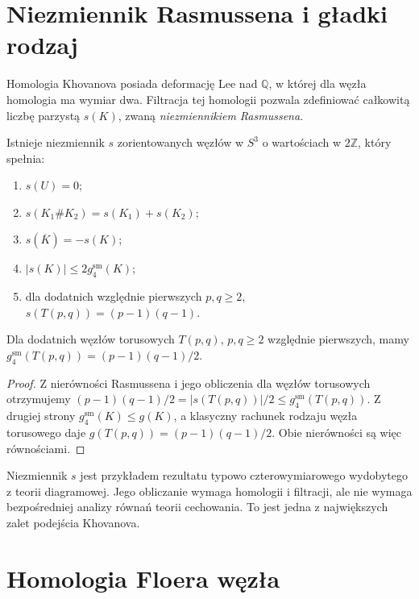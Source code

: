 \section{Niezmiennik Rasmussena i gładki rodzaj}
\label{sec:kt-rasmussen}

Homologia Khovanova posiada deformację Lee nad $\mathbb Q$,
w której dla węzła homologia ma wymiar dwa. Filtracja
tej homologii pozwala zdefiniować całkowitą liczbę parzystą
$s(K)$, zwaną \emph{niezmiennikiem Rasmussena}.

\begin{twierdzenie}[Rasmussen]
Istnieje niezmiennik $s$ zorientowanych węzłów w $S^3$
o wartościach w $2\mathbb Z$, który spełnia:
\begin{enumerate}[label=(\roman*)]
\item $s(U)=0$;
\item $s(K_1\#K_2)=s(K_1)+s(K_2)$;
\item $s(\overline K)=-s(K)$;
\item $|s(K)|\leq2g_4^{\mathrm{sm}}(K)$;
\item dla dodatnich względnie pierwszych $p,q\geq2$,
$s(T(p,q))=(p-1)(q-1)$.
\end{enumerate}
\end{twierdzenie}

\begin{wniosek}
Dla dodatnich węzłów torusowych $T(p,q)$,
$p,q\geq2$ względnie pierwszych, mamy
$g_4^{\mathrm{sm}}(T(p,q))=(p-1)(q-1)/2$.
\end{wniosek}

\begin{proof}
Z nierówności Rasmussena i jego obliczenia dla węzłów
torusowych otrzymujemy
$(p-1)(q-1)/2=|s(T(p,q))|/2\leq g_4^{\mathrm{sm}}(T(p,q))$.
Z drugiej strony $g_4^{\mathrm{sm}}(K)\leq g(K)$,
a klasyczny rachunek rodzaju węzła torusowego daje
$g(T(p,q))=(p-1)(q-1)/2$. Obie nierówności są więc
równościami.
\end{proof}

\begin{uwaga}
Niezmiennik $s$ jest przykładem rezultatu typowo
czterowymiarowego wydobytego z teorii diagramowej.
Jego obliczanie wymaga homologii i filtracji, ale nie
wymaga bezpośredniej analizy równań teorii cechowania.
To jest jedna z największych zalet podejścia Khovanova.
\end{uwaga}

\section{Homologia Floera węzła}
\label{sec:kt-hfk}

